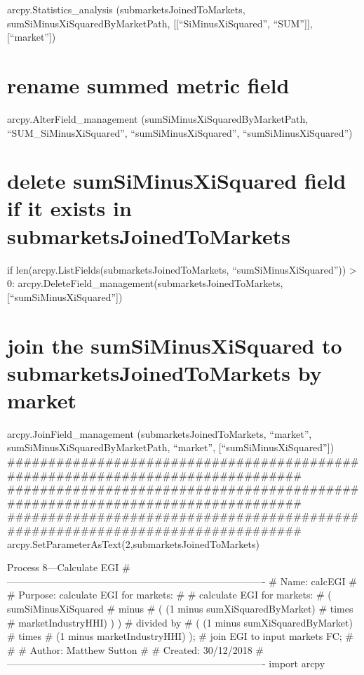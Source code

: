 \documentclass[]{article}
\begin{document}
arcpy.Statistics\_analysis (submarketsJoinedToMarkets,
sumSiMinusXiSquaredByMarketPath, {[}{[}``SiMinusXiSquared'',
``SUM''{]}{]}, {[}``market''{]})

\section{rename summed metric field}\label{rename-summed-metric-field-6}

arcpy.AlterField\_management (sumSiMinusXiSquaredByMarketPath,
``SUM\_SiMinusXiSquared'', ``sumSiMinusXiSquared'',
``sumSiMinusXiSquared'')

\section{delete sumSiMinusXiSquared field if it exists in
submarketsJoinedToMarkets}\label{delete-sumsiminusxisquared-field-if-it-exists-in-submarketsjoinedtomarkets}

if len(arcpy.ListFields(submarketsJoinedToMarkets,
``sumSiMinusXiSquared'')) \textgreater{} 0:
arcpy.DeleteField\_management(submarketsJoinedToMarkets,{[}``sumSiMinusXiSquared''{]})

\section{join the sumSiMinusXiSquared to submarketsJoinedToMarkets by
market}\label{join-the-sumsiminusxisquared-to-submarketsjoinedtomarkets-by-market}

arcpy.JoinField\_management (submarketsJoinedToMarkets, ``market'',
sumSiMinusXiSquaredByMarketPath, ``market'',
{[}``sumSiMinusXiSquared''{]})
\#\#\#\#\#\#\#\#\#\#\#\#\#\#\#\#\#\#\#\#\#\#\#\#\#\#\#\#\#\#\#\#\#\#\#\#\#\#\#\#\#\#\#\#\#\#\#\#\#\#\#\#\#\#\#\#\#\#\#\#\#\#\#\#\#\#\#\#\#\#\#\#\#\#\#\#\#\#\#
\#\#\#\#\#\#\#\#\#\#\#\#\#\#\#\#\#\#\#\#\#\#\#\#\#\#\#\#\#\#\#\#\#\#\#\#\#\#\#\#\#\#\#\#\#\#\#\#\#\#\#\#\#\#\#\#\#\#\#\#\#\#\#\#\#\#\#\#\#\#\#\#\#\#\#\#\#\#\#
\#\#\#\#\#\#\#\#\#\#\#\#\#\#\#\#\#\#\#\#\#\#\#\#\#\#\#\#\#\#\#\#\#\#\#\#\#\#\#\#\#\#\#\#\#\#\#\#\#\#\#\#\#\#\#\#\#\#\#\#\#\#\#\#\#\#\#\#\#\#\#\#\#\#\#\#\#\#\#
arcpy.SetParameterAsText(2,submarketsJoinedToMarkets)

Process 8---Calculate EGI
\#-------------------------------------------------------------------------------
\# Name: calcEGI \# \# Purpose: calculate EGI for markets: \# \#
calculate EGI for markets: \# ( sumSiMinusXiSquared \# minus \# ( (1
minus sumXiSquaredByMarket) \# times \# marketIndustryHHI) ) ) \#
divided by \# ( (1 minus sumXiSquaredByMarket) \# times \# (1 minus
marketIndustryHHI) ); \# join EGI to input markets FC; \# \# \# Author:
Matthew Sutton \# \# Created: 30/12/2018
\#-------------------------------------------------------------------------------
import arcpy
\end{document}
